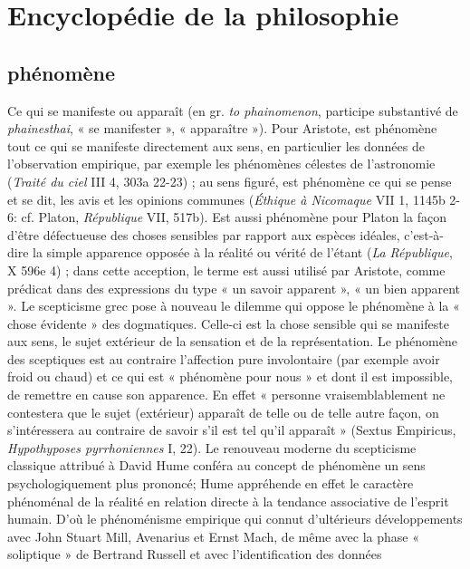 
\section{Encyclopédie de la philosophie}
\subsection{phénomène}

Ce qui se manifeste ou apparaît
(en gr. {\it to phainomenon}, participe substantivé
de {\it phainesthai}, « se manifester »,
« apparaître »). Pour Aristote, est phénomène
tout ce qui se manifeste directement
aux sens, en particulier les données
de l’observation empirique, par exemple
les phénomènes célestes de l’astronomie
({\it Traité du ciel} III 4, 303a 22-23) ; au sens
figuré, est phénomène ce qui se pense et
se dit, les avis et les opinions communes
({\it Éthique à Nicomaque} VII 1, 1145b 2-6:
cf. Platon, {\it République} VII, 517b). Est
aussi phénomène pour Platon la façon
d’être défectueuse des choses sensibles
par rapport aux espèces idéales, c'est-à-dire
la simple apparence opposée à la réalité
ou vérité de l’étant ({\it La République}, X
596e 4) ; dans cette acception, le terme est
aussi utilisé par Aristote, comme prédicat
dans des expressions du type « un savoir
apparent », « un bien apparent ». Le scepticisme
grec pose à nouveau le dilemme
qui oppose le phénomène à la « chose évidente »
des dogmatiques. Celle-ci est la
chose sensible qui se manifeste aux sens,
le sujet extérieur de la sensation et de la
représentation. Le phénomène des sceptiques
est au contraire l'affection pure
involontaire (par exemple avoir froid ou
chaud) et ce qui est « phénomène pour
nous » et dont il est impossible, de
remettre en cause son apparence. En effet
« personne vraisemblablement ne contestera
que le sujet (extérieur) apparaît de
telle ou de telle autre façon, on s’intéressera
au contraire de savoir s’il est tel qu’il
apparaît » (Sextus Empiricus, {\it Hypothyposes
pyrrhoniennes} I, 22). Le renouveau
moderne du scepticisme classique attribué
à David Hume conféra au concept de
phénomène un sens psychologiquement
plus prononcé; Hume appréhende en
effet le caractère phénoménal de la réalité
en relation directe à la tendance associative
de l'esprit humain. D'où le phénoménisme
empirique qui connut d'ultérieurs
développements avec John Stuart Mill,
Avenarius et Ernst Mach, de même avec
la phase « soliptique » de Bertrand Russell
et avec l'identification des données
